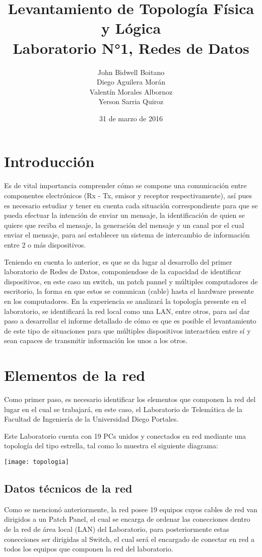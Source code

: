 \documentclass[spanish]{udpreport}
\title{
	Levantamiento de Topología Física y Lógica\\[2ex]
	\normalsize
	Laboratorio N°1, Redes de Datos
    }
\author{John Bidwell Boitano\\ Diego Aguilera Morán \\ Valentín Morales Albornoz \\ Yerson Sarria Quiroz}
\date{31 de marzo de 2016}
\begin{document}
\maketitle

\tableofcontents

\chapter{Introducción}
 Es de vital importancia comprender cómo se compone una comunicación entre componentes electrónicos (Rx - Tx, emisor y receptor respectivamente), así pues es necesario estudiar y tener en cuenta cada situación correspondiente para que se pueda efectuar la intención de enviar un mensaje, la identificación de quien se quiere que reciba el mensaje, la generación del mensaje y un canal por el cual enviar el mensaje, para así establecer un sistema de intercambio de información entre 2 o más dispositivos.

 Teniendo en cuenta lo anterior, es que se da lugar al desarrollo del primer laboratorio de Redes de Datos, componiendose de la capacidad de identificar dispositivos, en este caso un switch, un patch pannel y múltiples computadores de escritorio, la forma en que estos se comunican (cable) hasta el hardware presente en los computadores. En la experiencia se analizará la topología presente en el laboratorio, se identificará la red local como una LAN, entre otros, para así dar paso a desarrollar el informe detallado de cómo es que es posible el levantamiento de este tipo de situaciones para que múltiples dispositivos interactúen entre sí y sean capaces de transmitir información los unos a los otros.



\chapter{ Elementos de la red }

Como primer paso, es necesario identificar los elementos que componen la red del lugar en el cual se trabajará, en este caso, el Laboratorio de Telemática de la Facultad de Ingeniería de la Universidad Diego Portales.
    
    Este Laboratorio cuenta con 19 PCs unidos y conectados en red mediante una topología del tipo estrella, tal como lo muestra el siguiente diagrama:
    
    \texttt{[image: topologia]}

\section {Datos técnicos de la red}
Como se mencionó anteriormente, la red posee 19 equipos cuyos cables de red van dirigidos a un Patch Panel, el cual se encarga de ordenar las conecciones dentro de la red de área local (LAN) del Laboratorio, para posteriormente estas conecciones ser dirigidas al Switch, el cual será el encargado de conectar en red a todos los equipos que componen la red del laboratorio.
\end{document}
